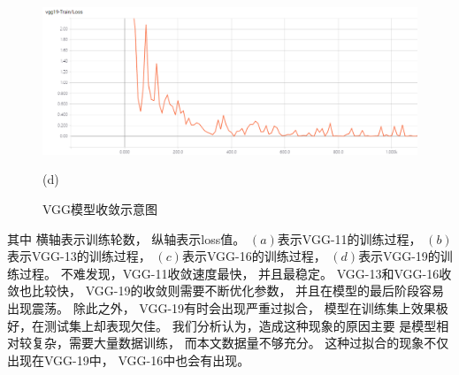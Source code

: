 \begin{figure}[htbp]
\begin{minipage}{1.0\linewidth}
\centerline{\includegraphics[width=1.0\linewidth]{figures/vgg19.png}}
\centerline{(d)}
\end{minipage}

\caption{VGG模型收敛示意图}
\label{fig:vggshoulian}
\end{figure}
其中
横轴表示训练轮数，
纵轴表示loss值。
$(a)$表示VGG-11的训练过程，
$(b)$表示VGG-13的训练过程，
$(c)$表示VGG-16的训练过程，
$(d)$表示VGG-19的训练过程。
不难发现，VGG-11收敛速度最快，
并且最稳定。
VGG-13和VGG-16收敛也比较快，
VGG-19的收敛则需要不断优化参数，
并且在模型的最后阶段容易出现震荡。
除此之外，
VGG-19有时会出现严重过拟合，
模型在训练集上效果极好，在测试集上却表现欠佳。
我们分析认为，造成这种现象的原因主要
是模型相对较复杂，需要大量数据训练，
而本文数据量不够充分。
这种过拟合的现象不仅出现在VGG-19中，
VGG-16中也会有出现。

